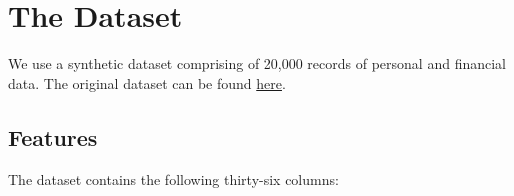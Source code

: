 \documentclass[12pt]{report}
\begin{document}
\tableofcontents
\newpage

\setcounter{page}{1}

\chapter{The Dataset}
We use a synthetic dataset comprising of 20,000 records of personal and financial data. The original dataset can be found \href{https://www.kaggle.com/datasets/lorenzozoppelletto/financial-risk-for-loan-approval?select=Loan.csv}{here}.

\section*{Features}
The dataset contains the following thirty-six columns:
\end{document}
